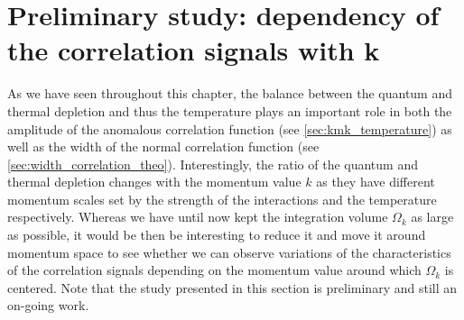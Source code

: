 


\section{Preliminary study: dependency of the correlation signals with k}

As we have seen throughout this chapter, the balance between the quantum and thermal depletion and thus the temperature plays an important role in both the amplitude of the anomalous correlation function (see \ref{sec:kmk_temperature}) as well as the width of the normal correlation function (see \ref{sec:width_correlation_theo}). Interestingly, the ratio of the quantum and thermal depletion changes with the momentum value $k$ as they have different momentum scales set by the strength of the interactions and the temperature respectively. Whereas we have until now kept the integration volume $\Omega_k$ as large as possible, it would be then be interesting to reduce it and move it around momentum space to see whether we can observe variations of the characteristics of the correlation signals depending on the momentum value around which $\Omega_k$ is centered. Note that the study presented in this section is preliminary and still an on-going work.

